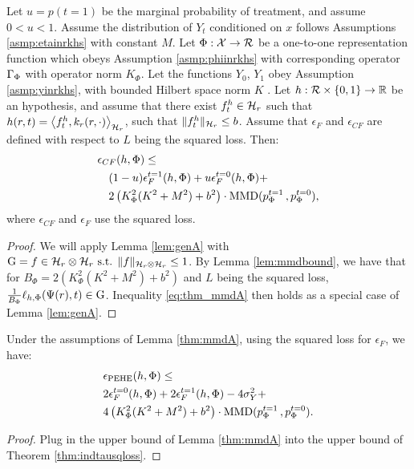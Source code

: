 \begin{thmapplem}\label{thm:mmdA}
Let $u = p(t=1)$ be the marginal probability of treatment, and assume $0<u<1$. Assume the distribution of $Y_t$ conditioned on $x$ follows Assumptions \ref{asmp:etainrkhs} with constant $M$.
Let $\Phi : \mathcal X \rightarrow \mathcal{R}$ be a one-to-one representation function which obeys Assumption \ref{asmp:phiinrkhs} with corresponding operator $\Gamma_\Phi$ with operator norm $K_\Phi$. Let the functions $Y_0$, $Y_1$ obey Assumption \ref{asmp:yinrkhs}, with bounded Hilbert space norm $K$ . Let $h : \mathcal{R} \times \{0,1\} \rightarrow \mathbb{R}$ be an hypothesis, and assume that there exist $f^h_t \in \mathcal H_r$ such that $h(r,t) = \left<f^h_t,k_r(r,\cdot)\right>_{\mathcal H_r}$, such that $\|f^h_t\|_{\mathcal H_r} \leq b$. Assume that $\epsilon_F$ and $\epsilon_{CF}$ are defined with respect to $L$ being the squared loss. Then:
\begin{align}\label{eq:thm_mmdA}
&\epsilon_{CF}(h,\Phi) \leq \nonumber\\
&\quad (1-u)  \epsilon^{t=1}_F(h,\Phi) + u  \epsilon^{t=0}_F(h,\Phi)  + \nonumber\\
& \quad 2 \left(K_\Phi^2 (K^2 +M^2) + b^2\right)  \cdot \text{MMD}(p^{t=1}_\Phi\, ,  p^{t=0}_\Phi),\nonumber\\
\end{align}
where $\epsilon_{CF}$ and $\epsilon_F$ use the squared loss.
\end{thmapplem}
\begin{proof}
We will apply Lemma \ref{lem:genA} with $\mathrm{G} = {f \in \mathcal H_r \otimes \mathcal H_r \text{ s.t. } \|f\|_{\mathcal H_r \otimes \mathcal H_r} \leq 1}$. By Lemma \ref{lem:mmdbound}, we have that for $B_\Phi = 2\left(K_\Phi^2 (K^2+M^2) + b^2\right)$ and $L$ being the squared loss, $\frac{1}{B_\Phi} \ell_{h,\Phi}(\Psi(r),t) \in \mathrm{G}$. Inequality \eqref{eq:thm_mmdA} then holds as a special case of Lemma \ref{lem:genA}.
\end{proof}

\begin{thmappthm}
Under the assumptions of Lemma \ref{thm:mmdA}, using the squared loss for $\epsilon_F$, we have:
\begin{align*}
&\epsilon_{\text{PEHE}}(h,\Phi) \leq \nonumber \\
&2 \epsilon^{t=0}_F(h,\Phi)  + 2\epsilon^{t=1}_F(h,\Phi)  - 4\sigma^2_Y +  \nonumber \\
&4 \left(K_\Phi^2 (K^2 +M^2) + b^2\right)  \cdot \text{MMD}( p^{t=1}_\Phi \, , p^{t=0}_\Phi) .
\end{align*}
\end{thmappthm}
\begin{proof}
Plug in the upper bound of Lemma \ref{thm:mmdA} into the upper bound of Theorem \ref{thm:indtausqloss}.
\end{proof}
